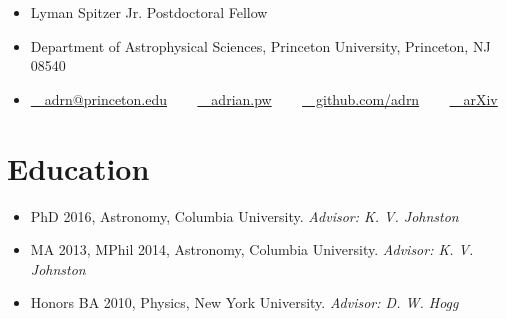 \documentclass[12pt, letterpaper]{apw-cv}
\begin{document}
\thispagestyle{empty}\sloppy\sloppypar




\begin{itemize}
  \item Lyman Spitzer Jr. Postdoctoral Fellow
  \item Department of Astrophysical Sciences, Princeton University, Princeton, NJ 08540
  \item
    \href{mailto:adrn@princeton.edu}{\faEnvelope~~adrn@princeton.edu}
    ~~~
	\href{http://adrian.pw}{\faExternalLink~~adrian.pw}
    ~~~
	\href{https://github.com/adrn}{\faGithub~~github.com/adrn}
    ~~~
    \href{\arxivurl}{~~arXiv}
\end{itemize}




\section*{Education}
	\begin{itemize}
	\item PhD 2016, Astronomy, Columbia University.
		{\it Advisor: K. V. Johnston}
	\item MA 2013, MPhil 2014, Astronomy, Columbia University.
		{\it Advisor: K. V. Johnston}
	\item Honors BA 2010, Physics, New York University.
		{\it Advisor: D. W. Hogg}
	\end{itemize}
\end{document}
